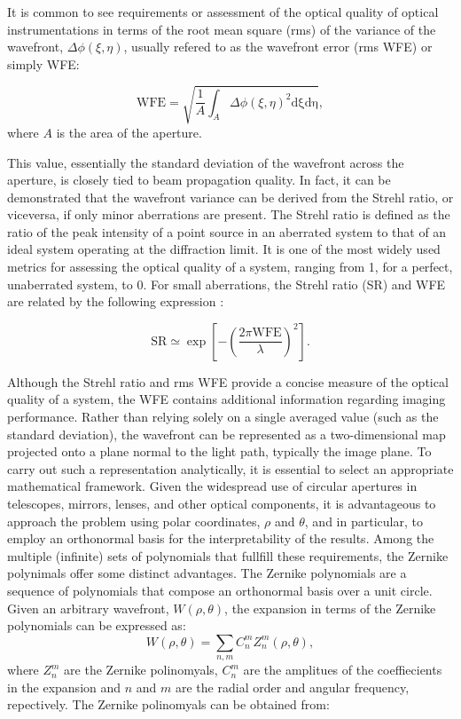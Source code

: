It is common to see requirements or assessment of the optical quality of optical instrumentations in terms of the root mean square (rms) of the variance of the wavefront, $\Delta \phi (\xi, \eta)$, usually refered to as the wavefront error (rms WFE) or simply WFE:

\begin{equation}
  \textrm{WFE} = \sqrt{\frac{1}{A}\int _ {A} \Delta \phi  \left(\xi, \eta \right) ^2 \mathrm{d \xi}\mathrm{d \eta}},
\end{equation}
where $A$ is the area of the aperture. 

This value, essentially the standard deviation of the wavefront across the aperture, is closely tied to beam propagation quality. In fact, it can be demonstrated that the wavefront variance can be derived from the Strehl ratio, or viceversa, if only minor aberrations are present. The Strehl ratio is defined as the ratio of the peak intensity of a point source in an aberrated system to that of an ideal system operating at the diffraction limit. It is one of the most widely used metrics for assessing the optical quality of a system, ranging from 1, for a perfect, unaberrated system, to 0. For small aberrations, the Strehl ratio (SR) and WFE are related by the following expression \citep{WFE_def}: 

\begin{equation}
  \textrm{SR} \simeq \exp \left[ - \left(\frac{2\pi \textrm{WFE}}{\lambda}\right) ^2 \right].
\end{equation}

Although the Strehl ratio and rms WFE provide a concise measure of the optical quality of a system, the WFE contains additional information regarding imaging performance. Rather than relying solely on a single averaged value (such as the standard deviation), the wavefront can be represented as a two-dimensional map projected onto a plane normal to the light path, typically the image plane. To carry out such a representation analytically, it is essential to select an appropriate mathematical framework. Given the widespread use of circular apertures in telescopes, mirrors, lenses, and other optical components, it is advantageous to approach the problem using polar coordinates, $\rho$ and $\theta$, and in particular, to employ an orthonormal basis for the interpretability of the results. Among the multiple (infinite) sets of polynomials that fullfill these requirements, the Zernike polynimals \citep{Zernike} offer some distinct advantages. The Zernike polynomials are a sequence of polynomials that compose an orthonormal basis over a unit circle. Given an arbitrary wavefront, $W(\rho, \theta)$, the expansion in terms of the Zernike polynomials can be expressed as:
\begin{equation}
  W(\rho, \theta) = \sum_{n, m} C _n ^m Z _ n ^m(\rho, \theta),
\end{equation}
where $Z _n ^m$ are the Zernike polinomyals, $C_n ^m$ are the amplitues of the coeffiecients in the expansion and $n$ and $m$ are the radial order and angular frequency, repectively. The Zernike polinomyals can be obtained from:

